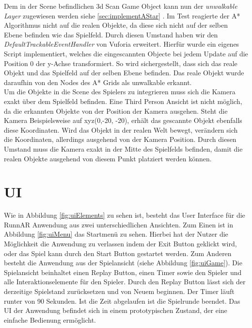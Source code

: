 Dem in der Scene befindlichen 3d Scan Game Object kann nun der \textit{unwalkable Layer} zugewiesen werden siehe \ref{sec:implementAStar} . Im Test reagierte der A* Algorithmus nicht auf die realen Objekte, da diese sich nicht auf der selben Ebene befinden wie das Spielfeld. Durch diesen Umstand haben wir den \textit{DefaultTrackableEventHandler} von Vuforia erweitert. Hierfür wurde ein eigenes Script implementiert, welches die eingescannten Objecte bei jedem Update auf die Position 0 der y-Achse transformiert. So wird sichergestellt, dass sich das reale Objekt und das Spielfeld auf der selben Ebene befinden. Das reale Objekt wurde daraufhin von den Nodes des A* Grids als unwalkable erkannt. \\
Um die Objekte in die Scene des Spielers zu integrieren muss sich die Kamera exakt über dem Spielfeld befinden. Eine Third Person Ansicht ist nicht möglich, da die erkannten Objekte von der Position der Kamera ausgehen. Steht die Kamera Beispielsweise auf xyz(0,-20, -20), erhält das gescannte Objekt ebenfalls diese Koordinaten. Wird das Objekt in der realen Welt bewegt, verändern sich die Koordinaten, allerdings ausgehend von der Kamera Position. Durch diesen Umstand muss die Kamera exakt in der Mitte des Spielfelds befinden, damit die realen Objekte ausgehend von diesem Punkt platziert werden können.

\section{UI}
Wie in Abbildung \ref{fig:uiElements} zu sehen ist, besteht das User Interface für die RunnAR Anwendung aus zwei unterschiedlichen Ansichten. Zum Einen ist in Abbildung \ref{fig:uiMenu} das Startmenü zu sehen. Hierbei hat der Nutzer die Möglichkeit die Anwendung zu verlassen indem der Exit Button geklickt wird, oder das Spiel kann durch den Start Button gestartet werden. Zum Anderen besteht die Anwendung aus der Spielansicht (siehe Abbildung \ref{fig:uiGame}). Die Spielansicht beinhaltet einen Replay Button, einen Timer sowie den Spieler und alle Interaktionselemente für den Spieler. Durch den Replay Button lässt sich der derzeitige Spielstand zurücksetzen und von Neuem beginnen. Der Timer läuft runter von 90 Sekunden. Ist die Zeit abgelaufen ist die Spielrunde beendet. Das UI der Anwendung befindet sich in einem prototypischen Zustand, der eine einfache Bedienung ermöglicht.


